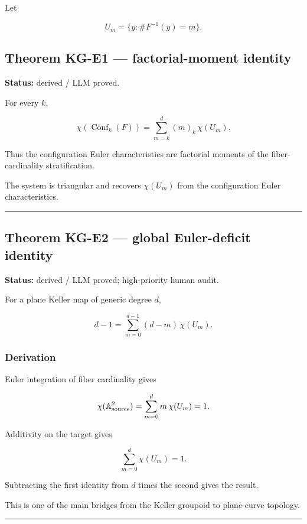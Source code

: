 Let

\[
U_m=\{y:\#F^{-1}(y)=m\}.
\]

\subsection{Theorem KG-E1 --- factorial-moment
identity}\label{theorem-kg-e1-factorial-moment-identity}

\textbf{Status:} derived / LLM proved.

For every \(k\),

\[
\boxed{
\chi(\operatorname{Conf}_k(F))
=
\sum_{m=k}^d (m)_k\,\chi(U_m).
}
\]

Thus the configuration Euler characteristics are factorial moments of
the fiber-cardinality stratification.

The system is triangular and recovers \(\chi(U_m)\) from the
configuration Euler characteristics.

\begin{center}\rule{0.5\linewidth}{0.5pt}\end{center}

\subsection{Theorem KG-E2 --- global Euler-deficit
identity}\label{theorem-kg-e2-global-euler-deficit-identity}

\textbf{Status:} derived / LLM proved; high-priority human audit.

For a plane Keller map of generic degree \(d\),

\[
\boxed{
d-1
=
\sum_{m=0}^{d-1}(d-m)\,\chi(U_m).
}
\]

\subsubsection{Derivation}\label{derivation}

Euler integration of fiber cardinality gives

\[
\chi(\mathbb A^2_{\rm source})
=
\sum_{m=0}^d m\,\chi(U_m)
=
1.
\]

Additivity on the target gives

\[
\sum_{m=0}^d\chi(U_m)=1.
\]

Subtracting the first identity from \(d\) times the second gives the
result.

This is one of the main bridges from the Keller groupoid to plane-curve
topology.

\begin{center}\rule{0.5\linewidth}{0.5pt}\end{center}

